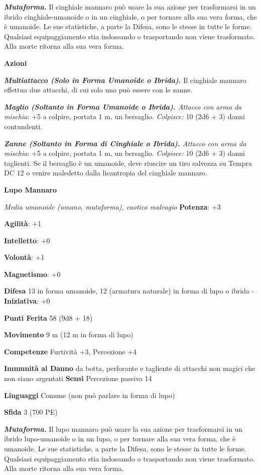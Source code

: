 \begin{multicols}{2}
\emph{\textbf{Mutaforma.}} Il cinghiale mannaro può usare la sua azione
per trasformarsi in un ibrido cinghiale-umanoide o in un cinghiale, o
per tornare alla sua vera forma, che è umanoide. Le sue statistiche, a
parte la Difesa, sono le stesse in tutte le forme. Qualsiasi equipaggiamento
stia indossando o trasportando non viene trasformato. Alla morte ritorna
alla sua vera forma.

\smallskip\textbf{Azioni}

\emph{\textbf{Multiattacco (Solo in Forma Umanoide o Ibrida).}} Il
cinghiale mannaro effettua due attacchi, di cui solo uno può essere con
le zanne.

\emph{\textbf{Maglio (Soltanto in Forma Umanoide o Ibrida).} Attacco con
arma da mischia}: +5 a colpire, portata 1 m, un bersaglio.
\emph{Colpisce:} 10 (2d6 + 3) danni contundenti.

\emph{\textbf{Zanne (Soltanto in Forma di Cinghiale o Ibrida).} Attacco
con arma da mischia}: +5 a colpire, portata 1 m, un bersaglio.
\emph{Colpisce:} 10 (2d6 + 3) danni taglienti. Se il bersaglio è un
umanoide, deve riuscire un tiro salvezza su Tempra DC 12 o venire
maledetto dalla licantropia del cinghiale mannaro.

\textbf{Lupo Mannaro}

\emph{Media umanoide (umano, mutaforma), caotico malvagio}
\textbf{Potenza}: +3

\textbf{Agilità}: +1

\textbf{Intelletto}: +0

\textbf{Volontà}: +1

\textbf{Magnetismo}: +0

\textbf{Difesa} 13 in forma umanoide, 12 (armatura naturale) in
forma di lupo o ibrida - \textbf{Iniziativa}: +0

\textbf{Punti Ferita} 58 (9d8 + 18)

\textbf{Movimento} 9 m (12 m in forma di lupo)

\textbf{Competenze} Furtività +3, Percezione +4

\textbf{Immunità al Danno} da botta, perforante e tagliente di
attacchi non magici che non siano argentati \textbf{Sensi} Percezione
passiva 14

\textbf{Linguaggi} Comune (non può parlare in forma di lupo)

\textbf{Sfida} 3 (700 PE)\smallskip

\emph{\textbf{Mutaforma.}} Il lupo mannaro può usare la sua azione per
trasformarsi in un ibrido lupo-umanoide o in un lupo, o per tornare alla
sua vera forma, che è umanoide. Le sue statistiche, a parte la Difesa, sono
le stesse in tutte le forme. Qualsiasi equipaggiamento stia indossando o
trasportando non viene trasformato. Alla morte ritorna alla sua vera
forma.


\end{multicols}
